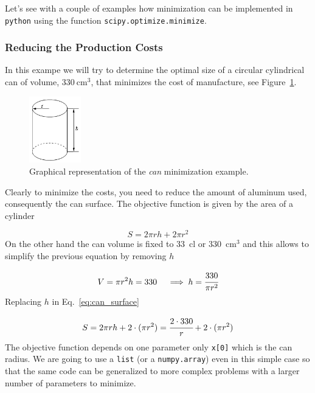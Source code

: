 Let's see with a couple of examples how minimization can be implemented in \texttt{python} using the function \texttt{scipy.optimize.minimize}.

\subsubsection{Reducing the Production Costs}
\label{example}

In this exampe we will try to determine the optimal size of a circular cylindrical can of volume, $330~\mathrm{cm}^3$, that minimizes the cost of manufacture, 
see Figure~\ref{fig:cylinder}.

\begin{figure}[ht]
\centering
\includegraphics[width=0.2\textwidth]{figures/cylinder.png}
\caption{Graphical representation of the \emph{can} minimization example.}
\label{fig:cylinder}
\end{figure}

Clearly to minimize the costs, you need to reduce the amount of aluminum used, consequently the can surface. 
The objective function is given by the area of a cylinder

\begin{equation} 
S = 2\pi rh + 2\pi r^2 
\label{eq:can_surface}
\end{equation}
On the other hand the can volume is fixed to 33~cl or 330~$\mathrm{cm}^3$ and this allows to simplify the previous equation by removing $h$

\begin{equation*} 
V = \pi r^2 h = 330\quad\implies h = \cfrac{330}{\pi r^2}
\end{equation*}
Replacing $h$ in Eq.~\ref{eq:can_surface} 

\begin{equation}
S = 2\pi rh + 2\cdot(\pi r^2) = \cfrac{2\cdot 330}{r} + 2\cdot(\pi r^2)
\end{equation}
The objective function depends on one parameter only \texttt{x[0]} which is the can radius. We are going to use a \texttt{list} (or a \texttt{numpy.array}) 
even in this simple case so that the same code can be generalized to more complex problems with a larger number of parameters to minimize. 

